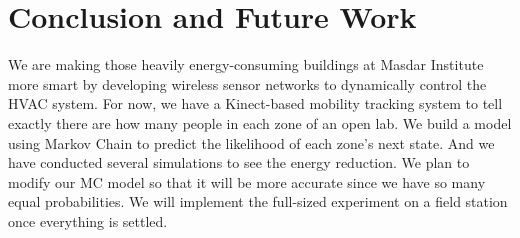 \documentclass{sig-alternate}
\begin{document}





\section{Conclusion and Future Work}
\label{sec:concl-future-work}
We are making those heavily energy-consuming buildings at Masdar
Institute more smart by developing wireless sensor networks to
dynamically control the HVAC system. For now, we have a Kinect-based
mobility tracking system to tell exactly there are how many people in
each zone of an open lab. We build a model using Markov Chain to
predict the likelihood of each zone's next state. And we have
conducted several simulations to see the energy reduction. We plan to
modify our MC model so that it will be more accurate since we have so
many equal probabilities. We will implement the full-sized experiment
on a field station once everything is settled. 











\end{document}
